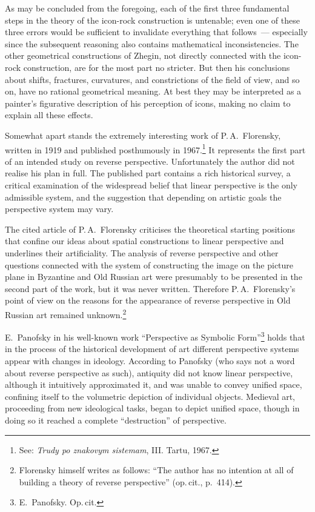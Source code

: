 {  As may be concluded from the foregoing, each of the first three fundamental steps
  in the theory of the icon-rock construction is untenable; even one of these three
  errors would be sufficient to invalidate everything that follows~--- especially
  since the subsequent reasoning also contains mathematical inconsistencies.  The
  other geometrical constructions of Zhegin, not directly connected with the
  icon-rock construction, are for the most part no stricter.  But then his
  conclusions about shifts, fractures, curvatures, and constrictions of the field of
  view, and so on, have no rational geometrical meaning.  At best they may be
  interpreted as a painter's figurative description of his perception of icons,
  making no claim to explain all these effects.}


Somewhat apart stands the extremely interesting work of P.\,A.~Florensky, written in
1919 and published posthumously in 1967.\footnote{See:
  \emph{Trudy po znakovym sistemam}, III.  Tartu, 1967.}
It represents the first part of an intended study on reverse perspective.
Unfortunately the author did not realise his plan in full.  The published part
contains a rich historical survey, a critical examination of the widespread belief
that linear perspective is the only admissible system, and the suggestion that
depending on artistic goals the perspective system may vary.

The cited article of P.\,A.~Florensky criticises the theoretical starting positions
that confine our ideas about spatial constructions to linear perspective and
underlines their artificiality.  The analysis of reverse perspective and other
questions connected with the system of constructing the image on the picture plane in
Byzantine and Old Russian art were presumably to be presented in the second part of
the work, but it was never written.  Therefore P.\,A.~Florensky's point of view on
the reasons for the appearance of reverse perspective in Old Russian art remained
unknown.\footnote{Florensky himself writes as follows: ``The author has no intention
  at all of building a theory of reverse perspective'' (op.\,cit., p.~414).}

E.~Panofsky in his well-known work ``Perspective as Symbolic
Form''\footnote{E.~Panofsky.  Op.\,cit.}
holds that in the process of the historical development of art different perspective
systems appear with changes in ideology.  According to Panofsky (who says not a word
about reverse perspective as such), antiquity did not know linear perspective,
although it intuitively approximated it, and was unable to convey unified space,
confining itself to the volumetric depiction of individual objects.  Medieval art,
proceeding from new ideological tasks, began to depict unified space, though in doing
so it reached a complete ``destruction'' of perspective.

